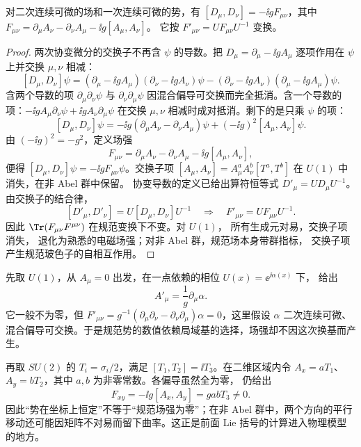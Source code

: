 \begin{proposition}[曲率与规范协变场强]
对二次连续可微的场和一次连续可微的势，有
$[D_\mu,D_\nu]=-\ii gF_{\mu\nu}$，其中
$F_{\mu\nu}=\partial_\mu A_\nu-\partial_\nu A_\mu-\ii g[A_\mu,A_\nu]$。
它按 $F'_{\mu\nu}=UF_{\mu\nu}U^{-1}$ 变换。
\end{proposition}
\begin{proof}
两次协变微分的交换子不再含 $\psi$ 的导数。把 $D_\mu=\partial_\mu-\ii gA_\mu$ 逐项作用在 $\psi$ 上并交换 $\mu,\nu$ 相减：
\[
[D_\mu,D_\nu]\psi
=(\partial_\mu-\ii gA_\mu)(\partial_\nu-\ii gA_\nu)\psi-(\partial_\nu-\ii gA_\nu)(\partial_\mu-\ii gA_\mu)\psi.
\]
含两个导数的项 $\partial_\mu\partial_\nu\psi$ 与 $\partial_\nu\partial_\mu\psi$ 因混合偏导可交换而完全抵消。含一个导数的项：$-\ii gA_\mu\partial_\nu\psi+\ii gA_\nu\partial_\mu\psi$ 在交换 $\mu,\nu$ 相减时成对抵消。剩下的是只乘 $\psi$ 的项：
\[
[D_\mu,D_\nu]\psi
=-\ii g(\partial_\mu A_\nu-\partial_\nu A_\mu)\psi
+(-\ii g)^2[A_\mu,A_\nu]\psi.
\]
由 $(-\ii g)^2=-g^2$，定义场强
\begin{equation}
F_{\mu\nu}
=\partial_\mu A_\nu-\partial_\nu A_\mu
-\ii g[A_\mu,A_\nu],
\label{eq:nonabelian-field-strength}
\end{equation}
便得 $[D_\mu,D_\nu]\psi=-\ii gF_{\mu\nu}\psi$。交换子项 $[A_\mu,A_\nu]=A_\mu^aA_\nu^b[T^a,T^b]$ 在 $U(1)$ 中消失，在非 Abel 群中保留。
协变导数的定义已给出算符恒等式 $D'_\mu=UD_\mu U^{-1}$。由交换子的结合律，
\[
[D'_\mu,D'_\nu]=U[D_\mu,D_\nu]U^{-1}
\quad\Longrightarrow\quad
F'_{\mu\nu}=UF_{\mu\nu}U^{-1}.
\]
因此
$\Tr(F_{\mu\nu}F^{\mu\nu})$ 在规范变换下不变。对 $U(1)$，
所有生成元对易，交换子项消失，
退化为熟悉的电磁场强；对非 Abel 群，规范场本身带群指标，
交换子项产生规范玻色子的自相互作用。

\end{proof}

\begin{example}
先取 $U(1)$，从 $A_\mu=0$ 出发，在一点依赖的相位 $U(x)=\ee^{\ii\alpha(x)}$ 下， 给出
\[
A'_\mu=\frac1g\partial_\mu\alpha.
\]
它一般不为零，但
$F'_{\mu\nu}=g^{-1}(\partial_\mu\partial_\nu-\partial_\nu\partial_\mu)\alpha=0$，这里假设 $\alpha$ 二次连续可微、混合偏导可交换。于是规范势的数值依赖局域基的选择，场强却不因这次换基而产生。

再取 $SU(2)$ 的 $T_i=\sigma_i/2$，满足 $[T_1,T_2]=\ii T_3$。在二维区域内令 $A_x=aT_1$、$A_y=bT_2$，其中 $a,b$ 为非零常数。各偏导虽然全为零， 仍给出
\[
F_{xy}=-\ii g[A_x,A_y]=gabT_3\ne0.
\]
因此“势在坐标上恒定”不等于“规范场强为零”；在非 Abel 群中，两个方向的平行移动还可能因矩阵不对易而留下曲率。这正是前面 Lie 括号的计算进入物理模型的地方。
\end{example}

